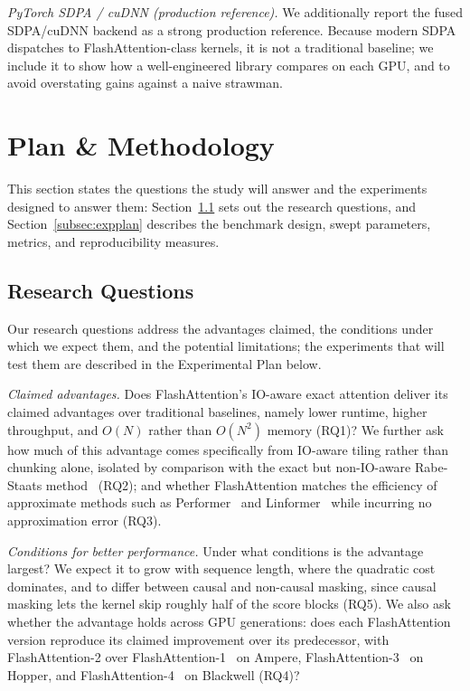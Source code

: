 \documentclass[sigconf,nonacm]{acmart}
\newcommand{\lead}[1]{\textit{#1}\quad}
\begin{document}
\lead{PyTorch SDPA / cuDNN (production reference).}
We additionally report the fused SDPA/cuDNN backend as a strong production
reference. Because modern SDPA dispatches to FlashAttention-class kernels, it is
not a traditional baseline; we include it to show how a well-engineered library
compares on each GPU, and to avoid overstating gains against a naive strawman.

\section{Plan \& Methodology}
\label{sec:plan}
This section states the questions the study will answer and the experiments
designed to answer them: Section~\ref{subsec:rqs} sets out the research
questions, and Section~\ref{subsec:expplan} describes the benchmark design,
swept parameters, metrics, and reproducibility measures.

\subsection{Research Questions}
\label{subsec:rqs}
Our research questions address the advantages claimed, the conditions under which
we expect them, and the potential limitations; the experiments that will test
them are described in the Experimental Plan below.

\lead{Claimed advantages.}
Does FlashAttention's IO-aware exact attention deliver its claimed advantages
over traditional baselines, namely lower runtime, higher throughput, and $O(N)$
rather than $O(N^2)$ memory (RQ1)? We further ask how much of this advantage comes
specifically from IO-aware tiling rather than chunking alone, isolated by
comparison with the exact but non-IO-aware Rabe-Staats
method~\cite{rabe2021selfattention} (RQ2); and whether FlashAttention matches the
efficiency of approximate methods such as
Performer~\cite{choromanski2021performer} and
Linformer~\cite{wang2020linformer} while incurring no approximation error (RQ3).

\lead{Conditions for better performance.}
Under what conditions is the advantage largest? We expect it to grow with
sequence length, where the quadratic cost dominates, and to differ between causal
and non-causal masking, since causal masking lets the kernel skip roughly half of
the score blocks (RQ5). We also ask whether the advantage holds across GPU
generations: does each FlashAttention version reproduce its claimed improvement
over its predecessor, with FlashAttention-2 over
FlashAttention-1~\cite{dao2023flashattention2} on Ampere,
FlashAttention-3~\cite{shah2024flashattention3} on Hopper, and
FlashAttention-4~\cite{zadouri2026flashattention4} on Blackwell (RQ4)?
\end{document}

